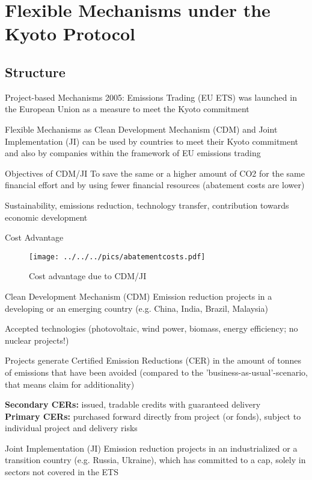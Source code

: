\section{Flexible Mechanisms under the Kyoto Protocol}
\subsection{Structure}

Project-based Mechanisms
	2005:  Emissions Trading (EU ETS) was launched in the European Union as a measure to meet the Kyoto commitment
	
	Flexible Mechanisms as Clean Development Mechanism (CDM) and Joint Implementation (JI) can be used by countries
	to meet their Kyoto commitment and also by companies within the framework of EU emissions 	trading

Objectives of CDM/JI
	To save the same or a higher amount of CO2 for the same financial effort and by using fewer financial resources (abatement costs are lower)
	
	Sustainability, emissions reduction, technology transfer, contribution towards economic development
 

Cost Advantage
	\begin{figure}[h!]
	\centering
	\texttt{[image: ../../../pics/abatementcosts.pdf]}
	\caption{Cost advantage due to CDM/JI}
	\label{fig:CDM/JI}
	\end{figure}


Clean Development Mechanism (CDM)
	Emission reduction projects in a developing or an emerging country (e.g. China, India, Brazil, Malaysia)
	
	Accepted technologies (photovoltaic, wind power, biomass, energy efficiency; no nuclear projects!)
	
	Projects generate Certified Emission Reductions (CER) in the amount of tonnes of emissions that have been 
	avoided (compared to the 'business-as-usual'-scenario, that means claim for additionality)

	\textbf{Secondary CERs:} issued, tradable credits with guaranteed delivery \\
	
	\textbf{Primary CERs:} purchased forward directly from project (or fonds), subject to individual project and delivery risks


Joint Implementation (JI)
	Emission reduction projects in an industrialized or a transition country (e.g. Russia, Ukraine), which has committed to a cap, solely in sectors not covered in the ETS
 
